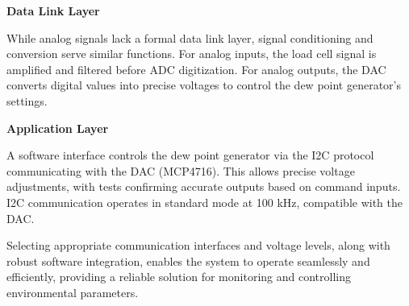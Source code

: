 \textbf{Data Link Layer}

While analog signals lack a formal data link layer, signal conditioning and conversion serve similar functions. For analog inputs, the load cell signal is amplified and filtered before ADC digitization. For analog outputs, the DAC converts digital values into precise voltages to control the dew point generator's settings.

\textbf{Application Layer}

A software interface controls the dew point generator via the I2C protocol communicating with the DAC (MCP4716). This allows precise voltage adjustments, with tests confirming accurate outputs based on command inputs. I2C communication operates in standard mode at 100 kHz, compatible with the DAC.

Selecting appropriate communication interfaces and voltage levels, along with robust software integration, enables the system to operate seamlessly and efficiently, providing a reliable solution for monitoring and controlling environmental parameters.

